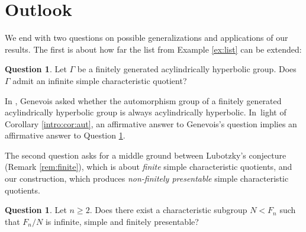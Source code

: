 \documentclass[JEP,XML,SOM,Unicode]{cedram}
\theoremstyle{definition}
\newtheorem{question}[theorem]{Question}
\begin{document}
\section{Outlook}

We end with two questions on possible generalizations and applications of our results. The first is about how far the list from Example \ref{ex:list} can be extended:

\begin{question}
\label{q:genevois}
Let $\Gamma$ be a finitely generated acylindrically hyperbolic group. Does~$\Gamma$ admit an infinite simple characteristic quotient?
\end{question}

In \cite[Quest.\,1.1]{auto:oneend}, Genevois asked whether the automorphism group of a finitely generated acylindrically hyperbolic group is always acylindrically hyperbolic. In~light of Corollary \ref{intro:cor:aut}, an affirmative answer to Genevois's question implies an affirmative answer to Question \ref{q:genevois}.

The second question asks for a middle ground between Lubotzky's conjecture (Remark \ref{rem:finite}), which is about \emph{finite} simple characteristic quotients, and our construction, which produces \emph{non-finitely presentable} simple characteristic quotients.

\begin{question}
Let $n \geq 2$. Does there exist a characteristic subgroup $N < F_n$ such that $F_n / N$ is infinite, simple and finitely presentable?
\end{question}

\backmatter


\end{document}
